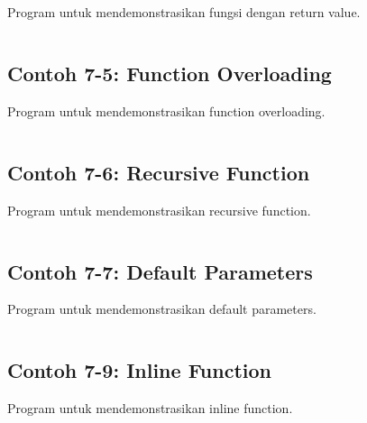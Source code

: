 Program untuk mendemonstrasikan fungsi dengan return value.

\begin{lstlisting}[language=c++, caption=Fungsi dengan Return Value]

\end{lstlisting}

\subsection{Contoh 7-5: Function Overloading}

Program untuk mendemonstrasikan function overloading.

\begin{lstlisting}[language=c++, caption=Function Overloading]

\end{lstlisting}

\subsection{Contoh 7-6: Recursive Function}

Program untuk mendemonstrasikan recursive function.

\begin{lstlisting}[language=c++, caption=Recursive Function]

\end{lstlisting}

\subsection{Contoh 7-7: Default Parameters}

Program untuk mendemonstrasikan default parameters.

\begin{lstlisting}[language=c++, caption=Default Parameters]

\end{lstlisting}

\subsection{Contoh 7-9: Inline Function}

Program untuk mendemonstrasikan inline function.

\begin{lstlisting}[language=c++, caption=Inline Function]

\end{lstlisting}

